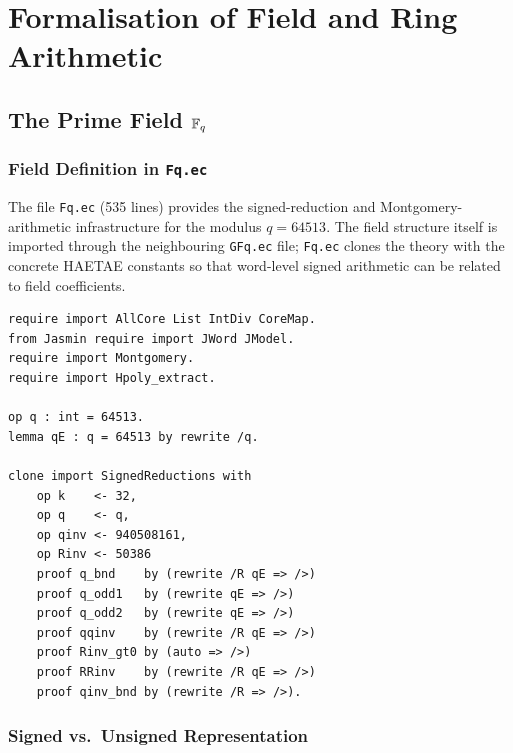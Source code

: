 
\chapter{Formalisation of Field and Ring Arithmetic}
\label{ch:field_ring}

\section[The Prime Field Fq]{The Prime Field $\mathbb{F}_q$}

\subsection{Field Definition in \texttt{Fq.ec}}

The file \texttt{Fq.ec} (535 lines) provides the signed-reduction and
Montgomery-arithmetic infrastructure for the modulus \(q=64513\).  The field
structure itself is imported through the neighbouring \texttt{GFq.ec} file;
\texttt{Fq.ec} clones the  theory with the concrete
HAETAE constants so that word-level signed arithmetic can be related to
field coefficients.

\begin{lstlisting}[language=EasyCrypt,
  caption={Field declaration in \texttt{Fq.ec}},
  label={lst:fq_decl}]
require import AllCore List IntDiv CoreMap.
from Jasmin require import JWord JModel.
require import Montgomery.
require import Hpoly_extract.

op q : int = 64513.
lemma qE : q = 64513 by rewrite /q.

clone import SignedReductions with
    op k    <- 32,
    op q    <- q,
    op qinv <- 940508161,
    op Rinv <- 50386
    proof q_bnd    by (rewrite /R qE => />)
    proof q_odd1   by (rewrite qE => />)
    proof q_odd2   by (rewrite qE => />)
    proof qqinv    by (rewrite /R qE => />)
    proof Rinv_gt0 by (auto => />)
    proof RRinv    by (rewrite /R qE => />)
    proof qinv_bnd by (rewrite /R => />).
\end{lstlisting}

\subsection{Signed vs.\ Unsigned Representation}

